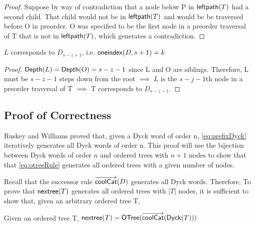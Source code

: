 \begin{proof}
    Suppose by way of contradiction that a node below P in $\mathsf{leftpath}{(T)}$ had a second child. That child would not be in $\mathsf{leftpath}{(T)}$ and would be be traversed before O in preorder. O was specified to be the first node in a preorder traversal of T that is not in $\mathsf{leftpath}{(T)}$, which generates a contradiction.

\end{proof}

\begin{remark} \label{re:L_sz1}
    $L$ corresponds to $D_{s-z+1}$, i.e. $\mathsf{oneindex}({D}, s+1)=k$
\end{remark}
\begin{proof}

    $\mathsf{Depth}{(L)}=\mathsf{Depth}{(O)}=s-z-1$ since L and O are siblings. Therefore, L must be $s-z-1$ steps down from the root $\implies$ $L$ is the $s-j-1$th node in a preorder traversal of T $\implies$ T corresponds to $D_{s-z-1}$.


\end{proof}

\subsection{Proof of Correctness} 




Ruskey and Williams proved that, given a Dyck word of order n, \ref{eq:prefixDyck} iteratively generates all Dyck words of order n.  This proof will use the bijection between Dyck words of order $n$ and ordered trees with $n+1$ nodes to show that that \ref{eq:otreeRule} generates all ordered trees with a given number of nodes.  

Recall that the successor rule $\overrightarrow{\mathsf{coolCat}}{(D)}$ generates all Dyck words.  Therefore,  To prove that $\mathsf{nextree}{(T)}$ generates all ordered trees with $|T|$ nodes, it is sufficient to show that, given an arbitrary ordered tree T, 

\begin{theorem}
    Given an ordered tree T, $\mathsf{nextree}{(T)}=\mathsf{OTree}{(\overrightarrow{\mathsf{coolCat}}{(\mathsf{Dyck}{(T)})})}$
\end{theorem}

